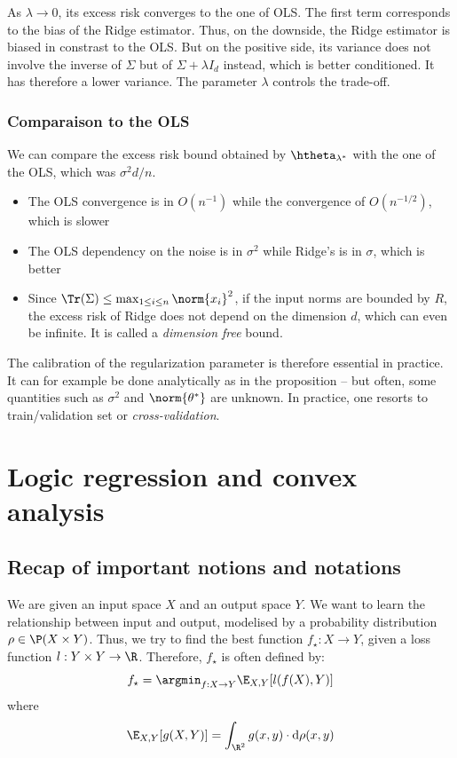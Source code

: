 \documentclass{../cs-classes/cs-classes}
\begin{document}
\begin{remark}
    As $\lambda\to0$, its excess risk converges to the one of OLS. The first term corresponds to the bias of the Ridge estimator. Thus, on the downside, the Ridge estimator is biased in constrast to the OLS. But on the positive side, its variance does not involve the inverse of $\Sigma$ but of $\Sigma+\lambda I_d$ instead, which is better conditioned. It has therefore a lower variance. The parameter $\lambda$ controls the trade-off.
\end{remark}

\subsubsection{Comparaison to the OLS}
We can compare the excess risk bound obtained by $\htheta_{\lambda^*}$ with the one of the OLS, which was $\sigma^2d/n$.
\begin{itemize}
    \item The OLS convergence is in $O(n^{-1})$ while the convergence of $O(n^{-1/2})$, which is slower
    \item The OLS dependency on the noise is in $\sigma^2$ while Ridge's is in $\sigma$, which is better
    \item Since $\Tr(\Sigma)\leq\max_{1\leq i\leq n}\norm{x_i}^2$, if the input norms are bounded by $R$, the excess risk of Ridge does not depend on the dimension $d$, which can even be infinite. It is called a \emph{dimension free} bound.
\end{itemize}
The calibration of the regularization parameter is therefore essential in practice. It can for example be done analytically as in the proposition -- but often, some quantities such as $\sigma^2$ and $\norm{\theta^*}$ are unknown. In practice, one resorts to train/validation set or \emph{cross-validation}.

\section{Logic regression and convex analysis}
\subsection*{Recap of important notions and notations}
We are given an input space $X$ and an output space $Y$. We want to learn the relationship between input and output, modelised by a probability distribution $\rho\in \P(X\times Y)$. Thus, we try to find the best function $f_\star:X\to Y$, given a loss function $l:Y\times Y\to\R$. Therefore, $f_\star$ is often defined by:
\begin{equation*}
    f_\star = \argmin_{f:X\to Y} \E_{X, Y}[l(f(X), Y)]
\end{equation*}
where
\begin{equation*}
    \E_{X, Y}[g(X, Y)] = \int_{\R^2} g(x, y) \cdot \mathrm{d}\rho(x, y)
\end{equation*}
\end{document}
